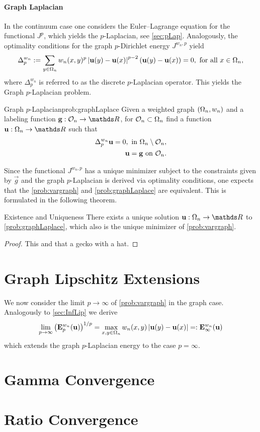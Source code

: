 \paragraph{Graph Laplacian}
%
In the continuum case one considers the Euler--Lagrange equation for the functional $J^{p}$, which yields the 
$p$-Laplacian, see \cref{sec:pLap}. Analogously, the optimality conditions for the graph $p$-Dirichlet energy $J^{w_n,p}$ yield
%
\begin{align*}
\Delta^{w_n}_p := \sum_{y\in\Omega_n} w_n(x,y)^p \left|\mathbf{u}(y) - \mathbf{u}(x)\right|^{p-2} \left( \mathbf{u}(y) - \mathbf{u}(x) \right) = 0, 
\text{ for all } x\in\Omega_n,
\end{align*}
%
where $\Delta^{w_n}_p$ is referred to as the discrete $p$-Laplacian operator. This yields the Graph $p$-Laplacian problem.
%
\begin{problem}{Graph $p$-Laplacian}{prob:graphLaplace}
Given a weighted graph $(\Omega_n, w_n)$ and a labeling function $\vec g:\conset_n\to\R$, for $\mathcal{O}_n\subset\Omega_n$ find 
a function $\vec u:\domain_n\to\R$ such that
%
\begin{align*}
\Delta_p^{w_n} \mathbf{u} = 0, \text{ in } \Omega_n\setminus \mathcal{O}_n,\\
\mathbf{u} = \mathbf{g} \text{ on } \mathcal{O}_n.
\end{align*}
\end{problem}
%
Since the functional $J^{w_n,p}$ has a unique minimizer subject to the constraints given by $\vec g$ and the graph $p$-Laplacian is derived 
via optimality conditions, one expects that the \cref{prob:vargraph} and \cref{prob:graphLaplace} are equivalent. This is formulated in the following 
theorem.
%
\begin{theorem}{Existence and Uniqueness}{}
There exists a unique solution $\vec u:\domain_n\to\R$ to \cref{prob:graphLaplace}, which also is the unique minimizer 
of \cref{prob:vargraph}.
\end{theorem}
%
\begin{proof}
This and that a gecko with a hat.
\end{proof}

\section{Graph Lipschitz Extensions}
%
We now consider the limit $p\to\infty$ of \cref{prob:vargraph} in the graph case. Analogously to \cref{sec:InfLip} we derive
%
\begin{align*}
\lim_{p\to\infty} \left(\mathbf{E}^{w_n}_p(\mathbf{u})\right)^{1/p}= \max_{x,y\in\Omega_n} w_n(x,y) \left|\mathbf{u}(y) - \mathbf{u}(x)\right|=:\mathbf{E}^{w_n}_\infty(\mathbf{u})
\end{align*}
%
which extends the graph $p$-Laplacian energy to the case $p=\infty$.

\section{Gamma Convergence}
%
\section{Ratio Convergence}
%

